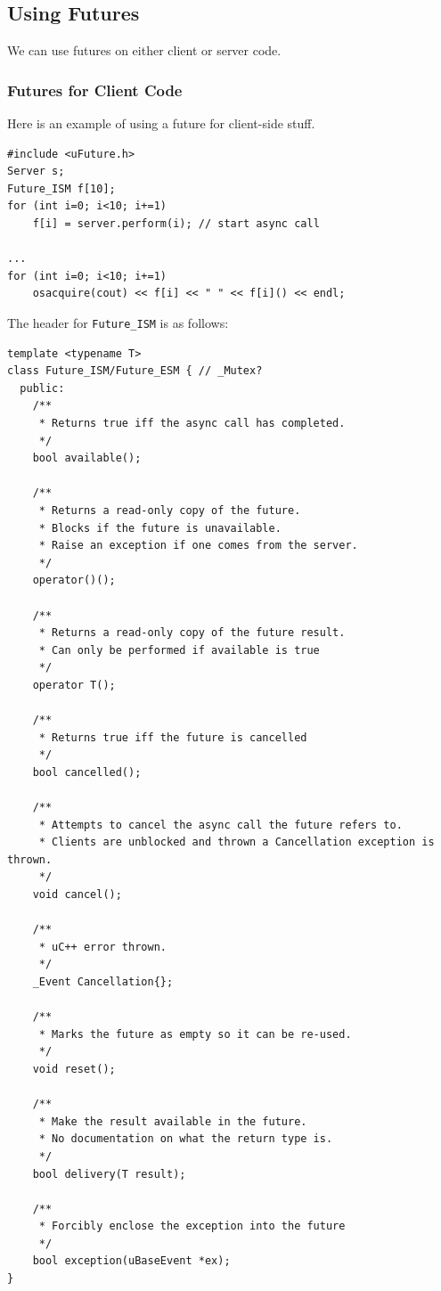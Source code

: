             \subsection{Using Futures} %
            \label{sub:using_futures}
                We can use futures on either client or server code.

                \subsubsection{Futures for Client Code} %
                \label{ssub:futures_for_client_code}
                    Here is an example of using a future for client-side stuff.
                    \begin{lstlisting}
#include <uFuture.h>
Server s;
Future_ISM f[10];
for (int i=0; i<10; i+=1)
    f[i] = server.perform(i); // start async call

...
for (int i=0; i<10; i+=1)
    osacquire(cout) << f[i] << " " << f[i]() << endl;
                    \end{lstlisting}

                    The header for \verb|Future_ISM| is as follows:
                    \begin{lstlisting}
template <typename T>
class Future_ISM/Future_ESM { // _Mutex?
  public:
    /**
     * Returns true iff the async call has completed.
     */
    bool available();

    /**
     * Returns a read-only copy of the future.
     * Blocks if the future is unavailable.
     * Raise an exception if one comes from the server.
     */
    operator()();

    /**
     * Returns a read-only copy of the future result.
     * Can only be performed if available is true
     */
    operator T();

    /**
     * Returns true iff the future is cancelled
     */
    bool cancelled();

    /**
     * Attempts to cancel the async call the future refers to.
     * Clients are unblocked and thrown a Cancellation exception is thrown.
     */
    void cancel();

    /**
     * uC++ error thrown.
     */
    _Event Cancellation{};

    /**
     * Marks the future as empty so it can be re-used.
     */
    void reset();

    /**
     * Make the result available in the future.
     * No documentation on what the return type is.
     */
    bool delivery(T result);

    /**
     * Forcibly enclose the exception into the future
     */
    bool exception(uBaseEvent *ex);
}
                    \end{lstlisting}
